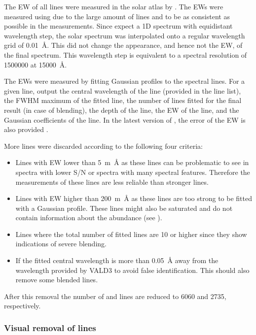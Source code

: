 The EW of all lines were measured in the solar atlas by \citet{Hinkle1995}. The EWs were measured
using \ARES due to the large amount of lines and to be as consistent as possible in the
measurements. Since \ARES expect a 1D spectrum with equidistant wavelength step, the solar spectrum
was interpolated onto a regular wavelength grid of \SI{0.01}{\angstrom}. This did not change the
appearance, and hence not the EW, of the final spectrum. This wavelength step is equivalent to a
spectral resolution of \num{1500000} at \SI{15000}{\angstrom}.

The EWs were measured by fitting Gaussian profiles to the spectral lines. For a given line, \ARES
output the central wavelength of the line (provided in the line list), the FWHM maximum of the
fitted line, the number of lines fitted for the final result (in case of blending), the depth of the
line, the EW of the line, and the Gaussian coefficients of the line. In the latest version of \ARES,
the error of the EW is also provided \citep{Sousa2015a}.

More lines were discarded according to the following four criteria:

\begin{itemize}
  \item Lines with EW lower than \SI{5}{m\angstrom} as these lines can be problematic to see in
        spectra with lower S/N or spectra with many spectral features. Therefore the measurements
        of these lines are less reliable than stronger lines.
  \item Lines with EW higher than \SI{200}{m\angstrom} as these lines are too strong to be fitted
        with a Gaussian profile. These lines might also be saturated and do not contain information
        about the abundance (see ).
  \item Lines where the total number of fitted lines are 10 or higher since they show indications of
        severe blending.
  \item If the fitted central wavelength is more than \SI{0.05}{\angstrom} away from the wavelength
        provided by VALD3 to avoid false identification. This should also remove some blended lines.
\end{itemize}
After this removal the number of  and  lines are reduced to \num{6060} and
\num{2735}, respectively.


\subsubsection{Visual removal of lines}

